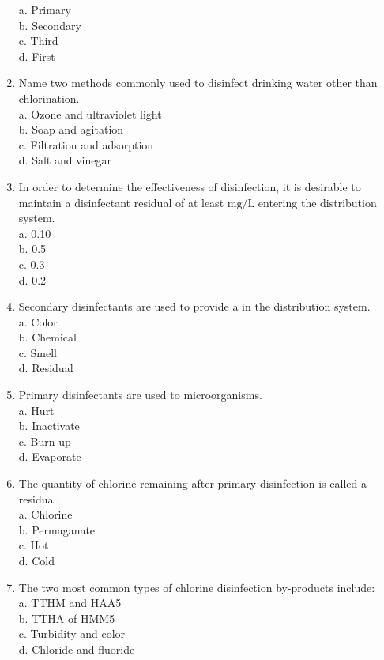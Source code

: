 \begin{enumerate}[1.]
a. Primary\\
b. Secondary\\
c. Third\\
d. First\\
\item Name two methods commonly used to disinfect drinking water other than chlorination.\\
a. Ozone and ultraviolet light\\
b. Soap and agitation\\
c. Filtration and adsorption\\
d. Salt and vinegar\\
\item In order to determine the effectiveness of disinfection, it is desirable to maintain a disinfectant residual of at least $\mathrm{mg} / \mathrm{L}$ entering the distribution system.\\
a. 0.10\\
b. 0.5\\
c. 0.3\\
d. 0.2\\
\item Secondary disinfectants are used to provide a in the distribution system.\\
a. Color\\
b. Chemical\\
c. Smell\\
d. Residual\\
\item Primary disinfectants are used to microorganisms.\\
a. Hurt\\
b. Inactivate\\
c. Burn up\\
d. Evaporate\\
\item The quantity of chlorine remaining after primary disinfection is called a residual.\\
a. Chlorine\\
b. Permaganate\\
c. Hot\\
d. Cold\\
\item The two most common types of chlorine disinfection by-products include:\\
a. TTHM and HAA5\\
b. TTHA of HMM5\\
c. Turbidity and color\\
d. Chloride and fluoride\\

\end{enumerate}

